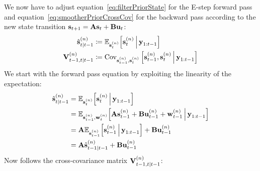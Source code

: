 		We now have to adjust equation~\eqref{eq:filterPriorState} for the E-step forward pass and equation~\eqref{eq:smootherPriorCrossCov} for the backward pass according to the new state transition \( \boldsymbol{\mathrm{s}}_{t + 1} = \boldsymbol{\mathrm{A}} \boldsymbol{\mathrm{s}}_t + \boldsymbol{\mathrm{B}} \boldsymbol{\mathrm{u}}_t \):
		\begin{align*}
			\hat{\boldsymbol{\mathrm{s}}}_{t \vert t - 1}^{(n)}  &\coloneqq \mathbb{E}_{\boldsymbol{\mathrm{s}}_t^{(n)}}\Big[\boldsymbol{\mathrm{s}}_t^{(n)} \,\Big\vert\, \boldsymbol{\mathrm{y}}_{1:t - 1}\Big] \\
			\boldsymbol{\mathrm{V}}_{t - 1, t \vert t - 1}^{(n)} &\coloneqq \operatorname{Cov}_{\boldsymbol{\mathrm{s}}_{t - 1}^{(n)}, \boldsymbol{\mathrm{s}}_t^{(n)}} \Big[\boldsymbol{\mathrm{s}}_{t - 1}^{(n)}, \boldsymbol{\mathrm{s}}_t^{(n)} \,\Big\vert\, \boldsymbol{\mathrm{y}}_{1:t - 1}\Big]
		\end{align*}
		We start with the forward pass equation by exploiting the linearity of the expectation:
		\begin{align*}
			\hat{\boldsymbol{\mathrm{s}}}_{t \vert t - 1}^{(n)}
				&= \mathbb{E}_{\boldsymbol{\mathrm{s}}_t^{(n)}}\Big[\boldsymbol{\mathrm{s}}_t^{(n)} \,\Big\vert\, \boldsymbol{\mathrm{y}}_{1:t - 1}\Big] \\
				&= \mathbb{E}_{\boldsymbol{\mathrm{s}}_{t - 1}^{(n)}, \boldsymbol{\mathrm{w}}_t^{(n)}}\Big[ \boldsymbol{\mathrm{A}} \boldsymbol{\mathrm{s}}_{t - 1}^{(n)} + \boldsymbol{\mathrm{B}} \boldsymbol{\mathrm{u}}_{t - 1}^{(n)} + \boldsymbol{\mathrm{w}}_{t - 1}^{(n)} \,\Big\vert\, \boldsymbol{\mathrm{y}}_{1:t - 1} \Big] \\
				&= \boldsymbol{\mathrm{A}} \mathbb{E}_{\boldsymbol{\mathrm{s}}_{t - 1}^{(n)}}\Big[\boldsymbol{\mathrm{s}}_{t - 1}^{(n)} \,\Big\vert\, \boldsymbol{\mathrm{y}}_{1:t - 1}\Big] + \boldsymbol{\mathrm{B}} \boldsymbol{\mathrm{u}}_{t - 1}^{(n)} \\
				&= \boldsymbol{\mathrm{A}} \hat{\boldsymbol{\mathrm{s}}}_{t - 1 \vert t - 1}^{(n)} + \boldsymbol{\mathrm{B}} \boldsymbol{\mathrm{u}}_{t - 1}^{(n)}
		\end{align*}
		Now follows the cross-covariance matrix \( \boldsymbol{\mathrm{V}}_{t - 1, t \vert t - 1}^{(n)} \):
